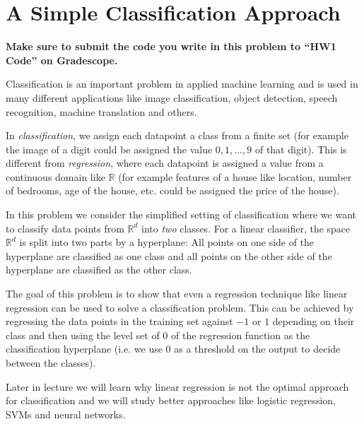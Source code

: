 \documentclass[preview]{standalone}
\begin{document}
\newcommand{\R}{\mathbb{R}}

\section{A Simple Classification Approach}

\textbf{Make sure to submit the code you write in this problem to ``HW1 Code'' on Gradescope.}

Classification is an important problem in applied machine
learning and is used in many different applications like image classification,
object detection, speech recognition, machine translation and others.

In \emph{classification}, we assign each datapoint a class from a finite set
(for example the image of a digit could be assigned the value $0, 1, \dots, 9$ of that digit).
This is different from \emph{regression}, where each datapoint is assigned a value from a
continuous domain like $\R$ (for example features of a house like location,
number of bedrooms, age of the house, etc. could be assigned the price of the house).

In this problem we consider the simplified setting of classification where we want to
classify data points from $\R^d$ into \emph{two} classes. For a linear classifier,
the space $\R^d$ is split into two parts by a hyperplane: All points on
one side of the hyperplane are classified as one class and all points on
the other side of the hyperplane are classified as the other class.

The goal of this problem is to
show that even a regression technique like linear regression can be used to solve a
classification problem. This can be
achieved by regressing the data points in the training set against $-1$ or $1$
depending on their class and then using the level set of 0 of the regression
function as the classification hyperplane (i.e. we use 0 as a threshold
on the output to decide between the classes).

Later in lecture we will learn why linear regression is not the optimal
approach for classification and we will study better approaches like logistic
regression, SVMs and neural networks.
\end{document}
